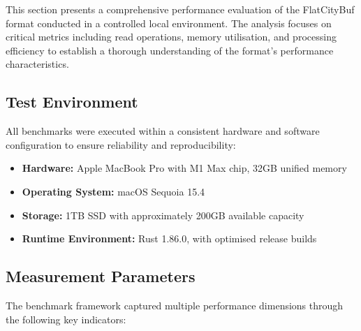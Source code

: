 This section presents a comprehensive performance evaluation of the FlatCityBuf format conducted in a controlled local environment. The analysis focuses on critical metrics including read operations, memory utilisation, and processing efficiency to establish a thorough understanding of the format's performance characteristics.

\subsection{Test Environment}
\label{result:benchmark_on_local_environment:test_environment}

All benchmarks were executed within a consistent hardware and software configuration to ensure reliability and reproducibility:

\begin{itemize}
  \item \textbf{Hardware:} Apple MacBook Pro with M1 Max chip, 32GB unified memory
  \item \textbf{Operating System:} macOS Sequoia 15.4
  \item \textbf{Storage:} 1TB SSD with approximately 200GB available capacity
  \item \textbf{Runtime Environment:} Rust 1.86.0, with optimised release builds
\end{itemize}

\subsection{Measurement Parameters}
\label{result:benchmark_on_local_environment:measurement_parameters}

The benchmark framework captured multiple performance dimensions through the following key indicators:

